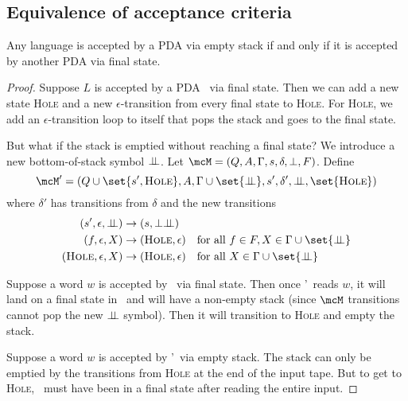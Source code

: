 \subsection{Equivalence of acceptance criteria}
\label{sec:criteria_equivalence}
\begin{theorem*}
    Any language is accepted by a PDA via empty stack if and only if
    it is accepted by another PDA via final state.
\end{theorem*}
\begin{proof}
    Suppose $L$ is accepted by a PDA \mcM\ via final state.
    Then we can add a new state \textsc{Hole} and a new
    $\epsilon$-transition from every final state to \textsc{Hole}.
    For \textsc{Hole}, we add an $\epsilon$-transition loop to itself
    that pops the stack and goes to the final state.

    But what if the stack is emptied without reaching a final state?
    We introduce a new bottom-of-stack symbol $\bot\!\!\!\bot$.
    Let $\mcM = (Q, A, \Gamma, s, \delta, \bot, F)$.
    Define \[
        \mcM' = (Q \cup \set{s', \textsc{Hole}}, A, \Gamma \cup \set{\bbot}, s', \delta', \bbot, \set{\textsc{Hole}})
    \] where $\delta'$ has transitions from $\delta$ and the new transitions
    \begin{align*}
        (s', \epsilon, \bbot) &\to (s, \bot\bbot) \\
        (f, \epsilon, X) &\to (\textsc{Hole}, \epsilon) \quad \text{for all } f \in F, X \in \Gamma \cup \set{\bbot} \\
        (\textsc{Hole}, \epsilon, X) &\to (\textsc{Hole}, \epsilon) \quad \text{for all } X \in \Gamma \cup \set{\bbot}
    \end{align*}

    Suppose a word $w$ is accepted by \mcM\ via final state.
    Then once \mcM'\ reads $w$, it will land on a final state in \mcM\ and
    will have a non-empty stack (since $\mcM$ transitions cannot pop the
    new $\bot\!\!\!\bot$ symbol).
    Then it will transition to \textsc{Hole} and empty the stack.

    Suppose a word $w$ is accepted by \mcM'\ via empty stack.
    The stack can only be emptied by the transitions from \textsc{Hole}
    at the end of the input tape.
    But to get to \textsc{Hole}, \mcM\ must have been in a final state
    after reading the entire input.
\end{proof}

